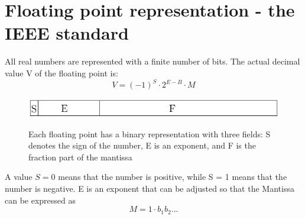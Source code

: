 \documentclass{article}
\begin{document}
\section{Floating point representation - the IEEE standard}
All real numbers are represented with a finite number of bits. The actual decimal value V of the floating point is: 
\begin{equation}
V = (-1)^S \cdot 2^{E-B} \cdot M
\end{equation}
\begin{figure}[H]
\includegraphics[scale=1.0]{ieee}
\label{floatingpoint}
\caption{Each floating point has a binary representation with three fields: S denotes the sign of the number, E is an exponent, and F is the fraction part of the mantissa}
\end{figure}
A value $S = 0$ means that the number is positive, while S = 1 means that the number is negative. E is an exponent that can be adjusted so that the Mantissa can be expressed as 
\begin{equation}
M = 1 \cdot b_{1} b_{2} ...
\end{equation}
\end{document}
